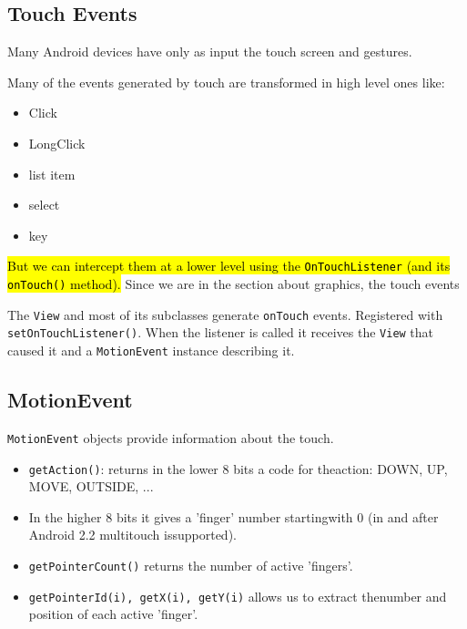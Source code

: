 \subsection{Touch Events}
Many Android devices have only as input the touch screen and gestures.

Many of the events generated by touch are transformed in high level ones like:
\begin{itemize}
    \item Click
    \item LongClick
    \item list item
    \item select
    \item key
\end{itemize}

\hl{But we can intercept them at a lower level using the
\texttt{OnTouchListener} (and its \texttt{onTouch()} method).} 
Since we are in the section about graphics, the touch events 

The \texttt{View} and most of its subclasses generate \texttt{onTouch} events.
Registered with \texttt{setOnTouchListener()}.
When the listener is called it receives the \texttt{View} that caused it and a
\texttt{MotionEvent} instance describing it.

\subsection{MotionEvent}
\texttt{MotionEvent} objects provide information about the touch. 

\begin{itemize}
    \item \texttt{getAction()}: returns in the lower 8 bits a code for theaction: DOWN, UP, MOVE, OUTSIDE, ...
    \item In the higher 8 bits it gives a 'finger' number startingwith 0 (in and after Android 2.2 multitouch issupported).
    \item \texttt{getPointerCount()} returns the number of active 'fingers'.
    \item \texttt{getPointerId(i), getX(i), getY(i)} allows us to extract thenumber and position of each active 'finger'.
\end{itemize}

